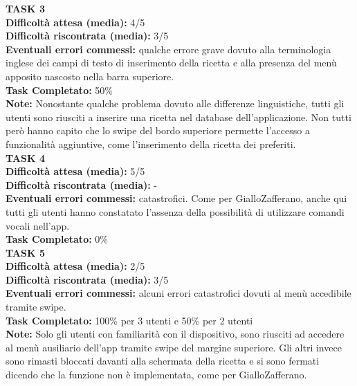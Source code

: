 \textbf{TASK 3}\\
\textbf{Difficoltà attesa (media):} 4/5\\
\textbf{Difficoltà riscontrata (media):} 3/5\\
\textbf{Eventuali errori commessi:} qualche errore grave dovuto alla terminologia inglese dei campi di testo di inserimento della ricetta e alla presenza del menù apposito nascosto nella barra superiore.\\
\textbf{Task Completato:} 50\%\\
\textbf{Note:} Nonostante qualche problema dovuto alle differenze linguistiche, tutti gli utenti sono riusciti a inserire una ricetta nel database dell'applicazione. Non tutti però hanno capito che lo swipe del bordo superiore permette l'accesso a funzionalità aggiuntive, come l'inserimento della ricetta dei preferiti.\\

\textbf{TASK 4}\\
\textbf{Difficoltà attesa (media):} 5/5\\
\textbf{Difficoltà riscontrata (media):} -\\
\textbf{Eventuali errori commessi:} catastrofici. Come per GialloZafferano, anche qui tutti gli utenti hanno constatato l'assenza della possibilità di utilizzare comandi vocali nell'app.\\
\textbf{Task Completato:} 0\%\\

\textbf{TASK 5}\\
\textbf{Difficoltà attesa (media):} 2/5\\
\textbf{Difficoltà riscontrata (media):} 3/5\\
\textbf{Eventuali errori commessi:} alcuni errori catastrofici dovuti al menù accedibile tramite swipe.\\
\textbf{Task Completato:} 100\% per 3 utenti e 50\% per 2 utenti\\
\textbf{Note:} Solo gli utenti con familiarità con il dispositivo, sono riusciti ad accedere al menù ausiliario dell'app tramite swipe del margine superiore. Gli altri invece sono rimasti bloccati davanti alla schermata della ricetta e si sono fermati dicendo che la funzione non è implementata, come per GialloZafferano.\\


